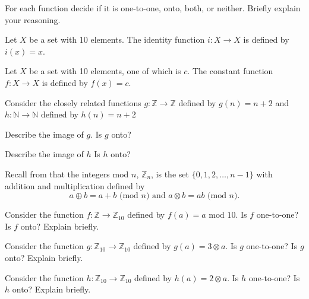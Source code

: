 \begin{exer}[\exerU] %
\label{exer_identity_constant_1to1_onto}
    For each function decide if it is one-to-one, onto, both, or neither.  Briefly explain your reasoning.
    
    \begin{apart}
        \item Let $X$ be a set with 10 elements.  The identity function $i: X \to X$ is defined by $i(x) = x$.
        \item Let $X$ be a set with 10 elements, one of which is $c$.  The constant function $f:X \to X$ is defined by $f(x) = c$.    
    \end{apart}
\end{exer}

\begin{exer}[\exerU] %
\label{exer_nplus2_onetoone_onto}
    Consider the closely related functions $g: \mathbb{Z} \to \mathbb{Z}$ defined by $g(n) = n+2$ and $h: \mathbb{N} \to \mathbb{N}$ defined by $h(n) = n+2$
        \begin{apart}
            \item Describe the image of $g$.  Is $g$ onto?  
            \item Describe the image of $h$  Is $h$ onto? 
        \end{apart}
\end{exer}

\begin{exer}[\exerU] %
\label{exer_functions_on_Zn}
    Recall from  that the integers mod $n$, $\mathbb{Z}_n$, is the set $\{0,1,2,\ldots, n-1\}$ with addition and multiplication defined by 
        $$a \oplus b = a + b \text{ (mod }n) \text{ and }a \otimes b = ab \text{ (mod }n).$$
    \begin{exerpart}
        \item  Consider the function $f: \mathbb{Z} \to \mathbb{Z}_{10}$ defined by $f(a) = a \text{ mod } 10$.  Is $f$ one-to-one?  Is $f$ onto? Explain briefly.
        \item Consider the function $g: \mathbb{Z}_{10} \to \mathbb{Z}_{10}$ defined by $g(a) = 3 \otimes a$.  Is $g$ one-to-one?  Is $g$ onto? Explain briefly.
        \item Consider the function $h: \mathbb{Z}_{10} \to \mathbb{Z}_{10}$ defined by $h(a) = 2 \otimes a$.  Is $h$ one-to-one?  Is $h$ onto? Explain briefly.
    \end{exerpart}
\end{exer}

